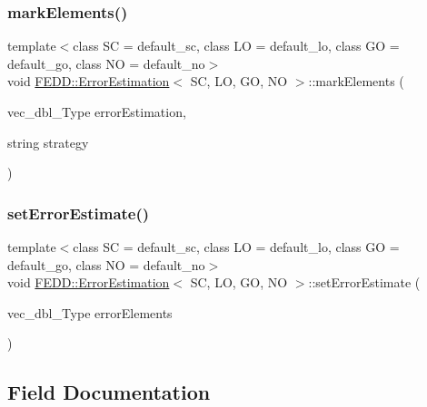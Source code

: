 \subsubsection{\texorpdfstring{mark\+Elements()}{markElements()}}
{\footnotesize\ttfamily template$<$class SC  = default\+\_\+sc, class LO  = default\+\_\+lo, class GO  = default\+\_\+go, class NO  = default\+\_\+no$>$ \\
void \hyperlink{classFEDD_1_1ErrorEstimation}{F\+E\+D\+D\+::\+Error\+Estimation}$<$ SC, LO, GO, NO $>$\+::mark\+Elements (\begin{DoxyParamCaption}\item[{vec\+\_\+dbl\+\_\+\+Type}]{error\+Estimation,  }\item[{string}]{strategy }\end{DoxyParamCaption})}

\mbox{\label{classFEDD_1_1ErrorEstimation_a9e2db66d1ec69da791d2facdcb1ccaf9}} 
\subsubsection{\texorpdfstring{set\+Error\+Estimate()}{setErrorEstimate()}}
{\footnotesize\ttfamily template$<$class SC  = default\+\_\+sc, class LO  = default\+\_\+lo, class GO  = default\+\_\+go, class NO  = default\+\_\+no$>$ \\
void \hyperlink{classFEDD_1_1ErrorEstimation}{F\+E\+D\+D\+::\+Error\+Estimation}$<$ SC, LO, GO, NO $>$\+::set\+Error\+Estimate (\begin{DoxyParamCaption}\item[{vec\+\_\+dbl\+\_\+\+Type}]{error\+Elements }\end{DoxyParamCaption})\hspace{0.3cm}{\ttfamily [inline]}}



\subsection{Field Documentation}
\mbox{\label{classFEDD_1_1ErrorEstimation_ae0395855399463136ef23963c50d92fb}} 
